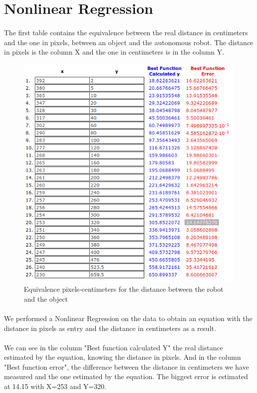 \documentclass[12pt]{report}
\begin{document}
\section{Nonlinear Regression}
	\paragraph{}
	The first table contains the equivalence between the real distance in centimeters and the one in pixels, between an object and the autonomous robot. The distance in pixels is the column X and the one in centimeters is in the column Y.
	\begin{figure}[H]
		\begin{center}
			\includegraphics[scale=0.6]{res/reg2D.png}
			\caption{Equivalence pixels-centimeters for the distance between the robot and the object}
		\end{center}
	\end{figure}
\paragraph{}
We performed a Nonlinear Regression on the data to obtain an equation with the distance in pixels as entry and the distance in centimeters as a result.

\paragraph{}
We can see in the column "Best function calculated Y" the real distance estimated by the equation, knowing the distance in pixels. And in the column "Best function error", the difference between the distance in centimeters we have measured and the one estimated by the equation. The biggest error is estimated at 14.15 with X=253 and Y=320. 
\end{document}
